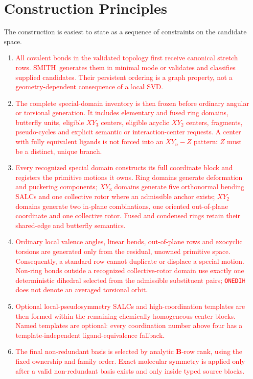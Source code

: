 \documentclass[journal=jctcce,manuscript=article,layout=traditional]{achemso}
\newcommand{\SMITH}{\textsc{SMITH}}
\newcommand{\Bmat}{\mathbf{B}}
\theoremstyle{definition}
\begin{document}
\section{Construction Principles}

The construction is easiest to state as a sequence of constraints on the
candidate space.

\begin{enumerate}
\item \textcolor{red}{All covalent bonds in the validated topology first
receive canonical stretch rows.  \SMITH\ generates them in minimal mode or
validates and classifies supplied candidates.  Their persistent ordering is a
graph property, not a geometry-dependent consequence of a local SVD.}
\item \textcolor{red}{The complete special-domain inventory is then frozen
before ordinary angular or torsional generation.  It includes elementary and
fused ring domains, butterfly units, eligible \(XY_3\) centers, eligible
acyclic \(XY_2\) centers, fragments, pseudo-cycles and explicit semantic or
interaction-center requests.  A center with fully equivalent ligands is not
forced into an \(XY_n-Z\) pattern: \(Z\) must be a distinct, unique branch.}
\item \textcolor{red}{Every recognized special domain constructs its full
coordinate block and registers the primitive motions it owns.  Ring domains
generate deformation and puckering components; \(XY_3\) domains generate five
orthonormal bending SALCs and one collective rotor where an admissible anchor
exists; \(XY_2\) domains generate two in-plane combinations, one oriented
out-of-plane coordinate and one collective rotor.  Fused and condensed rings
retain their shared-edge and butterfly semantics.}
\item \textcolor{red}{Ordinary local valence angles, linear bends,
out-of-plane rows and exocyclic torsions are generated only from the residual,
unowned primitive space.  Consequently, a standard row cannot duplicate or
displace a special motion.  Non-ring bonds outside a recognized
collective-rotor domain use exactly one deterministic dihedral selected from
the admissible substituent pairs; \texttt{ONEDIH} does not denote an averaged
torsional orbit.}
\item \textcolor{red}{Optional local-pseudosymmetry SALCs and
high-coordination templates are then formed within the remaining chemically
homogeneous center blocks.  Named templates are optional: every coordination
number above four has a template-independent ligand-equivalence fallback.}
\item \textcolor{red}{The final non-redundant basis is selected by analytic
\(\Bmat\)-row rank, using the fixed ownership and family order.  Exact
molecular symmetry is applied only after a valid non-redundant basis exists
and only inside typed source blocks.}
\end{enumerate}
\end{document}
